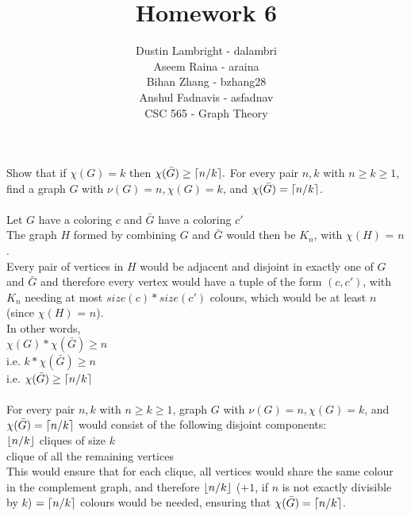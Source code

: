 \documentclass[12pt]{article}
\DeclarePairedDelimiter{\ceil}{\lceil}{\rceil}
\DeclarePairedDelimiter{\floor}{\lfloor}{\rfloor}
\newenvironment{question}[2][Question]{\begin{trivlist}
\item[\hskip \labelsep {\bfseries #1}\hskip \labelsep {\bfseries #2.}]}{\end{trivlist}}
\begin{document}


\title{Homework 6}%
\author{Dustin Lambright - dalambri \\ Aseem Raina - araina \\ Bihan Zhang - bzhang28 \\ Anshul Fadnavis - asfadnav\\
CSC 565 - Graph Theory} %

\maketitle


\begin{question}{3}
Show that if $\chi(G) = k$ then $\chi(\bar{G}) \geq \ceil[big]{n/k}.$ For every pair $n, k$ with $n \geq k \geq 1$, find a graph $G$ with $ν(G) = n, \chi(G) = k$, and $\chi(\bar{G}) = \ceil[big]{n/k}$.\\
\\
Let $G$ have a coloring $c$ and $\bar{G}$ have a coloring $c'$\\
The graph $H$ formed by combining $G$ and $\bar{G}$ would then be $K_n$, with $\chi(H)$ = $n$.
\\
Every pair of vertices in $H$ would be adjacent and disjoint in exactly one of $G$ and $\bar{G}$ and therefore every vertex would have a tuple of the form $(c, c')$, with $K_n$ needing at most $size(c) * size(c')$ colours, which would be at least $n$ (since $\chi(H)$ = $n$).\\
In other words,\\
\indent $\chi(G) * \chi(\bar{G}) \geq n$\\
i.e.	$k * \chi(\bar{G}) \geq n$\\
i.e.	$\chi(\bar{G}) \geq \ceil[big]{n/k}$\\
\\
For every pair $n, k$ with $n \geq k \geq 1$, graph $G$ with $ν(G) = n, \chi(G) = k$, and $\chi(\bar{G}) = \ceil[big]{n/k}$ would consist of the following disjoint components:\\
\indent $\floor{n/k}$ cliques of size $k$\\
 clique of all the remaining vertices\\
This would ensure that for each clique, all vertices would share the same colour in the complement graph, and therefore $\floor{n/k}$ ($+1$, if $n$ is not exactly divisible by $k$) $= \ceil[big]{n/k}$ colours would be needed, ensuring that $\chi(\bar{G}) = \ceil[big]{n/k}$.

\end{question}
\end{document}
